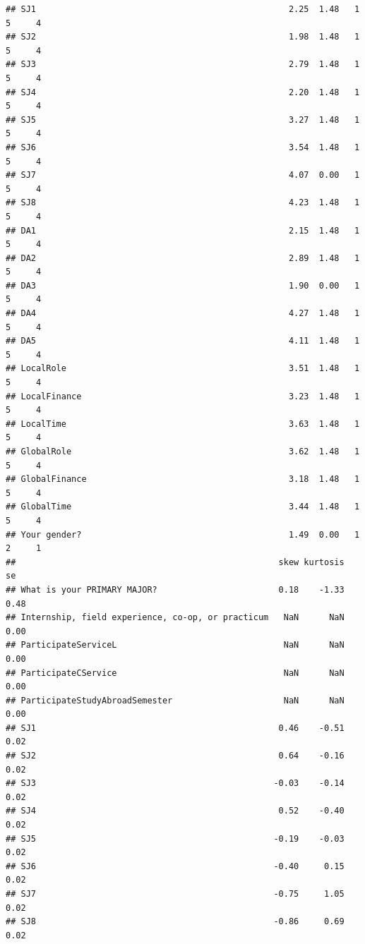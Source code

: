 \documentclass[
]{book}
\begin{document}
\begin{verbatim}
## SJ1                                                  2.25  1.48   1   5     4
## SJ2                                                  1.98  1.48   1   5     4
## SJ3                                                  2.79  1.48   1   5     4
## SJ4                                                  2.20  1.48   1   5     4
## SJ5                                                  3.27  1.48   1   5     4
## SJ6                                                  3.54  1.48   1   5     4
## SJ7                                                  4.07  0.00   1   5     4
## SJ8                                                  4.23  1.48   1   5     4
## DA1                                                  2.15  1.48   1   5     4
## DA2                                                  2.89  1.48   1   5     4
## DA3                                                  1.90  0.00   1   5     4
## DA4                                                  4.27  1.48   1   5     4
## DA5                                                  4.11  1.48   1   5     4
## LocalRole                                            3.51  1.48   1   5     4
## LocalFinance                                         3.23  1.48   1   5     4
## LocalTime                                            3.63  1.48   1   5     4
## GlobalRole                                           3.62  1.48   1   5     4
## GlobalFinance                                        3.18  1.48   1   5     4
## GlobalTime                                           3.44  1.48   1   5     4
## Your gender?                                         1.49  0.00   1   2     1
##                                                    skew kurtosis   se
## What is your PRIMARY MAJOR?                        0.18    -1.33 0.48
## Internship, field experience, co-op, or practicum   NaN      NaN 0.00
## ParticipateServiceL                                 NaN      NaN 0.00
## ParticipateCService                                 NaN      NaN 0.00
## ParticipateStudyAbroadSemester                      NaN      NaN 0.00
## SJ1                                                0.46    -0.51 0.02
## SJ2                                                0.64    -0.16 0.02
## SJ3                                               -0.03    -0.14 0.02
## SJ4                                                0.52    -0.40 0.02
## SJ5                                               -0.19    -0.03 0.02
## SJ6                                               -0.40     0.15 0.02
## SJ7                                               -0.75     1.05 0.02
## SJ8                                               -0.86     0.69 0.02

\end{verbatim}
\end{document}
